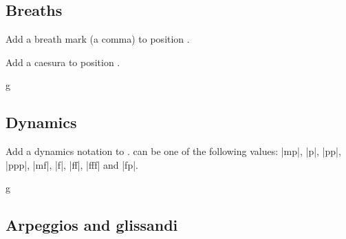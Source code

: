 \subsection{Breaths}\label{sec:inline:breaths}
\begin{command}{\tmbreath{}}
  Add a breath mark (a comma) to position .
\end{command}
\begin{command}{\tmcaesura{}}
  Add a caesura to position .
\end{command}
\begin{codeexample}[]
\begin{tmline}
\begin{tmstaff}{g}{}
\end{tmstaff}
\end{tmline}
\end{codeexample}
\subsection{Dynamics}\label{sec:inline:dynamics}
\begin{command}{\tmdynamics{}}
  Add a dynamics notation to .  can be one of the 
  following values: |mp|, |p|, |pp|, |ppp|, |mf|, |f|, |ff|, |fff| and |fp|.
\end{command}
\begin{codeexample}[]
\begin{tmline}
\begin{tmstaff}{g}{}
\end{tmstaff}
\end{tmline}
\end{codeexample}
\subsection{Arpeggios and glissandi}\label{sec:inline:arpeggio-glissando}
